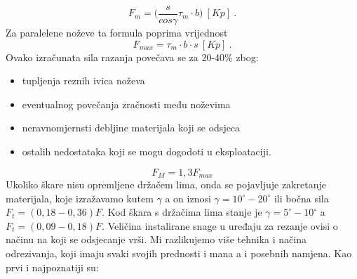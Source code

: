 \documentclass[a4paper,12pt]{article}
\numberwithin{figure}{section}
\begin{document}
\begin{equation}
F_{m} = \bigg(\frac{s}{cos\gamma}\tau_{m}\cdot b\bigg)\:[Kp]\:.
\end{equation}
Za paralelene noževe ta formula poprima vrijednost
\begin{equation}
F_{max} = \tau_{m}\cdot b \cdot s\:[Kp]\:.
\end{equation}
Ovako izračunata sila razanja povečava se za 20-40\% zbog:
\begin{itemize}
\item tupljenja reznih ivica noževa
\item eventualnog povečanja zračnosti među noževima
\item neravnomjernsti debljine materijala koji se odsjeca
\item ostalih nedostataka koji se mogu dogodoti u eksploataciji.
\end{itemize}
\begin{equation}
F_{M} = 1,3 F_{max}
\end{equation}
Ukoliko škare nisu opremljene držačem lima, onda se pojavljuje zakretanje materijala, koje izražavamo kutem $\gamma$ a on iznosi $\gamma = 10^{\circ} - 20^{\circ}$ ili bočna sila $F_{t} = (0,18 - 0,36)F$. Kod škara s držačima lima stanje je $\gamma = 5^{\circ}-10^{\circ}$ a $F_{t} = (0,09 - 0,18)F$. Veličina instalirane snage u uređaju za rezanje ovisi o načinu na koji se odsjecanje vrši. Mi razlikujemo više tehnika i načina odrezivanja, koji imaju svaki svojih prednosti i mana a i posebnih namjena. Kao prvi i najpoznatiji su:
\clearpage
\end{document}
